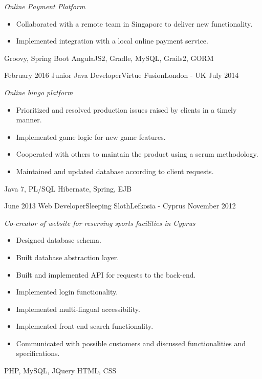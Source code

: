 \begin{experiences}
{        \emph{Online Payment Platform}
        \begin{itemize}
          \item Collaborated with a remote team in Singapore to deliver new functionality.
          \item Implemented integration with a local online payment service.
        \end{itemize}
      }
      {Groovy, Spring Boot}
      {AngulaJS2, Gradle, MySQL, Grails2, GORM}
    \emptySeparator

    \experience
      {February 2016}
      {Junior Java Developer}{Virtue Fusion}{London - UK}
      {July 2014}
      {
        \emph{Online bingo platform}
        \begin{itemize}
          \item Prioritized and resolved production issues raised by clients in a timely manner.
          \item Implemented game logic for new game features.
          \item Cooperated with others to maintain the product using a scrum methodology.
          \item Maintained and updated database according to client requests.
        \end{itemize}
      }
      {Java 7, PL/SQL}
      {Hibernate, Spring, EJB}
    \emptySeparator

    \experience
      {June 2013}
      {Web Developer}{Sleeping Sloth}{Lefkosia - Cyprus}
      {November 2012}
      {
        \emph{Co-creator of website for reserving sports facilities in Cyprus}
        \begin{itemize}
          \item Designed database schema.
          \item Built database abstraction layer.
          \item Built and implemented API for requests to the back-end.
          \item Implemented login functionality.
          \item Implemented multi-lingual accessibility.
          \item Implemented front-end search functionality.
          \item Communicated with possible customers and discussed functionalities and specifications.
        \end{itemize}
      }
      {PHP, MySQL, JQuery}
      {HTML, CSS}
  \end{experiences}
